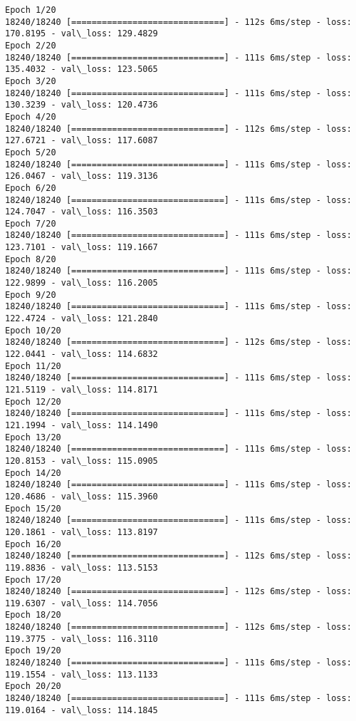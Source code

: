\documentclass[11pt]{article}
\begin{document}
    \begin{Verbatim}[commandchars=\\\{\}]
Epoch 1/20
18240/18240 [==============================] - 112s 6ms/step - loss: 170.8195 - val\_loss: 129.4829
Epoch 2/20
18240/18240 [==============================] - 111s 6ms/step - loss: 135.4032 - val\_loss: 123.5065
Epoch 3/20
18240/18240 [==============================] - 111s 6ms/step - loss: 130.3239 - val\_loss: 120.4736
Epoch 4/20
18240/18240 [==============================] - 112s 6ms/step - loss: 127.6721 - val\_loss: 117.6087
Epoch 5/20
18240/18240 [==============================] - 111s 6ms/step - loss: 126.0467 - val\_loss: 119.3136
Epoch 6/20
18240/18240 [==============================] - 111s 6ms/step - loss: 124.7047 - val\_loss: 116.3503
Epoch 7/20
18240/18240 [==============================] - 111s 6ms/step - loss: 123.7101 - val\_loss: 119.1667
Epoch 8/20
18240/18240 [==============================] - 111s 6ms/step - loss: 122.9899 - val\_loss: 116.2005
Epoch 9/20
18240/18240 [==============================] - 111s 6ms/step - loss: 122.4724 - val\_loss: 121.2840
Epoch 10/20
18240/18240 [==============================] - 112s 6ms/step - loss: 122.0441 - val\_loss: 114.6832
Epoch 11/20
18240/18240 [==============================] - 111s 6ms/step - loss: 121.5119 - val\_loss: 114.8171
Epoch 12/20
18240/18240 [==============================] - 111s 6ms/step - loss: 121.1994 - val\_loss: 114.1490
Epoch 13/20
18240/18240 [==============================] - 111s 6ms/step - loss: 120.8153 - val\_loss: 115.0905
Epoch 14/20
18240/18240 [==============================] - 111s 6ms/step - loss: 120.4686 - val\_loss: 115.3960
Epoch 15/20
18240/18240 [==============================] - 111s 6ms/step - loss: 120.1861 - val\_loss: 113.8197
Epoch 16/20
18240/18240 [==============================] - 112s 6ms/step - loss: 119.8836 - val\_loss: 113.5153
Epoch 17/20
18240/18240 [==============================] - 112s 6ms/step - loss: 119.6307 - val\_loss: 114.7056
Epoch 18/20
18240/18240 [==============================] - 112s 6ms/step - loss: 119.3775 - val\_loss: 116.3110
Epoch 19/20
18240/18240 [==============================] - 111s 6ms/step - loss: 119.1554 - val\_loss: 113.1133
Epoch 20/20
18240/18240 [==============================] - 111s 6ms/step - loss: 119.0164 - val\_loss: 114.1845

    \end{Verbatim}
\end{document}
